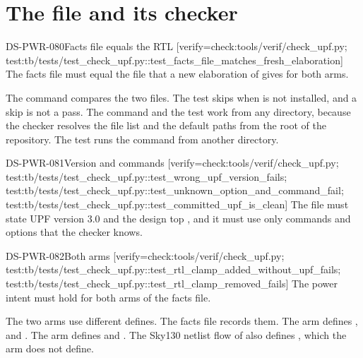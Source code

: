 \section{The file and its checker}\label{ds:ch:power-intent:file}

\begin{requirement}{DS-PWR-080}{Facts file equals the RTL}
[verify={check:tools/verif/check_upf.py; test:tb/tests/test_check_upf.py::test_facts_file_matches_fresh_elaboration}]
The facts file must equal the file that a new elaboration of  gives for both arms.
\end{requirement}
\begin{information}
The command  compares the two files. The test skips when  is not installed, and a skip is not a pass. The command and the test work from any directory, because the checker resolves the file list and the default paths from the root of the repository. The test  runs the command from another directory.
\end{information}

\begin{requirement}{DS-PWR-081}{Version and commands}
[verify={check:tools/verif/check_upf.py; test:tb/tests/test_check_upf.py::test_wrong_upf_version_fails; test:tb/tests/test_check_upf.py::test_unknown_option_and_command_fail; test:tb/tests/test_check_upf.py::test_committed_upf_is_clean}]
The file must state UPF version 3.0 and the design top , and it must use only commands and options that the checker knows.
\end{requirement}

\begin{requirement}{DS-PWR-082}{Both arms}
[verify={check:tools/verif/check_upf.py; test:tb/tests/test_check_upf.py::test_rtl_clamp_added_without_upf_fails; test:tb/tests/test_check_upf.py::test_rtl_clamp_removed_fails}]
The power intent must hold for both arms of the facts file.
\end{requirement}
\begin{information}
The two arms use different defines. The facts file records them. The arm  defines ,  and . The arm  defines  and . The Sky130 netlist flow of  also defines , which the arm does not define.
\end{information}

